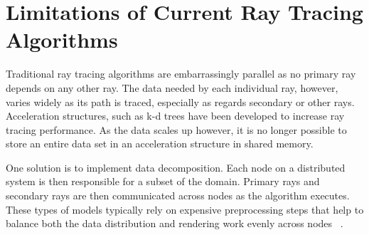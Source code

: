 \section{Limitations of Current Ray Tracing Algorithms}


Traditional ray tracing algorithms are embarrassingly parallel as no
primary ray depends on any other ray. The data needed by each
individual ray, however, varies widely as its path is traced,
especially as regards secondary or other rays. Acceleration
structures, such as k-d trees have been developed to increase ray
tracing performance. As the data scales up however, it is no longer
possible to store an entire data set in an acceleration structure in
shared memory.

One solution is to implement data decomposition. Each node on a
distributed system is then responsible for a subset of the domain.
Primary rays and secondary rays are then communicated across nodes as
the algorithm executes. These types of models typically rely on
expensive preprocessing steps that help to balance both the data
distribution and rendering work evenly across nodes
~\cite{navratil2014dynamic}.

